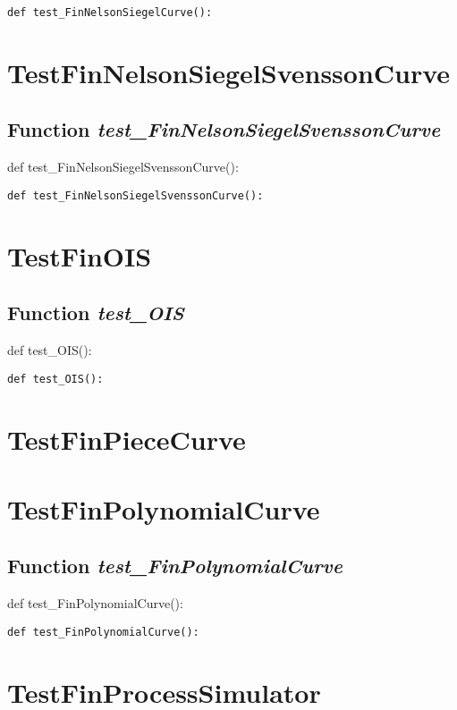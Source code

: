 \documentclass[twoside,11pt]{book}
\begin{document}
\begin{lstlisting}
def test_FinNelsonSiegelCurve():
\end{lstlisting}


\newpage
\section{TestFinNelsonSiegelSvenssonCurve}

\subsection{Function {\it test\_FinNelsonSiegelSvenssonCurve}}
def test\_FinNelsonSiegelSvenssonCurve():

\begin{lstlisting}
def test_FinNelsonSiegelSvenssonCurve():
\end{lstlisting}


\newpage
\section{TestFinOIS}

\subsection{Function {\it test\_OIS}}
def test\_OIS():

\begin{lstlisting}
def test_OIS():
\end{lstlisting}


\newpage
\section{TestFinPieceCurve}


\newpage
\section{TestFinPolynomialCurve}

\subsection{Function {\it test\_FinPolynomialCurve}}
def test\_FinPolynomialCurve():

\begin{lstlisting}
def test_FinPolynomialCurve():
\end{lstlisting}


\newpage
\section{TestFinProcessSimulator}
\end{document}

